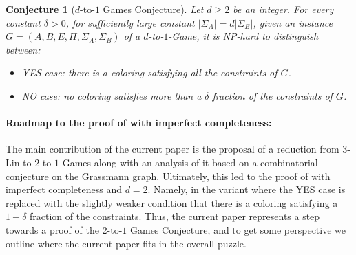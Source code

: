 \documentclass{toc}
\newtheorem{rconj}[theorem]{Conjecture}
\newcommand\card[1]{\left| {#1} \right|}
\renewcommand\geq{\geqslant}
\begin{document}
\begin{rconj}[$d$-to-$1$ Games Conjecture]\label{conj:d-to-1}
Let $d\geq 2$ be an integer. For every constant $\delta>0$, for sufficiently large constant $\card{\Sigma_A}=d\card{\Sigma_B}$,
given an instance $G=(A,B,E,\Pi,\Sigma_A,\Sigma_B)$ of a $d$-to-$1$-Game, it is NP-hard to distinguish between:
\begin{itemize}
\item YES case: there is a coloring satisfying all the constraints of $G$.
\item NO case: no coloring satisfies more than
a %
$\delta$ fraction of the constraints of $G$.
\end{itemize}
\end{rconj}

%
\paragraph{Roadmap to the proof of  with imperfect completeness:}
The main contribution of the current paper is the proposal of a reduction from $3$-Lin to $2$-to-$1$ Games along
with an analysis of it based on a combinatorial conjecture on the Grassmann graph. Ultimately, this led
to the proof of  with imperfect completeness and $d=2$. Namely, in the variant where
the YES case is replaced with the slightly weaker
condition that there is a coloring satisfying
a %
$1-\delta$ fraction of the constraints. Thus, the current paper represents
a step towards a proof of the $2$-to-$1$ Games Conjecture, and to get some perspective we outline where the current paper fits
in the overall puzzle.
\end{document}
